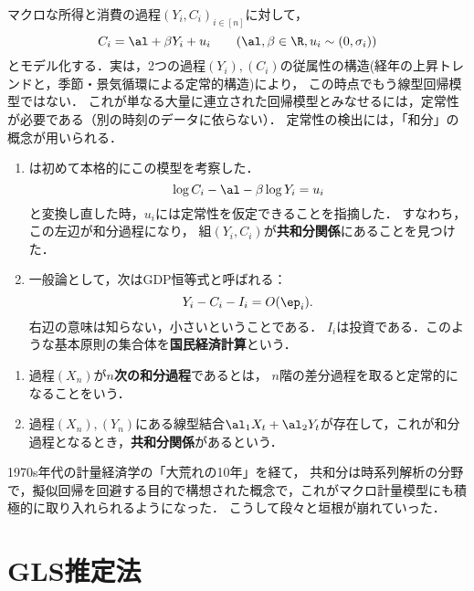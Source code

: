 \documentclass[uplatex,dvipdfmx]{jsreport}
\begin{document}
\begin{example}
    マクロな所得と消費の過程$(Y_i,C_i)_{i\in[n]}$に対して，
    \[C_i=\al+\beta Y_i+u_i\qquad(\al,\beta\in\R,u_i\sim(0,\sigma_i))\]
    とモデル化する．実は，2つの過程$(Y_i),(C_i)$の従属性の構造(経年の上昇トレンドと，季節・景気循環による定常的構造)により，
    この時点でもう線型回帰模型ではない．
    これが単なる大量に連立された回帰模型とみなせるには，定常性が必要である（別の時刻のデータに依らない）．
    定常性の検出には，「和分」の概念が用いられる．
    \begin{enumerate}
        \item \cite{Engle-Granger87}は初めて本格的にこの模型を考察した．
        \[\log C_i-\al-\beta\log Y_i=u_i\]
        と変換し直した時，$u_i$には定常性を仮定できることを指摘した．
        すなわち，この左辺が和分過程になり，
        組$(Y_i,C_i)$が\textbf{共和分関係}にあることを見つけた．
        \item 一般論として，次はGDP恒等式と呼ばれる：
        \[Y_i-C_i-I_i=O(\ep_i).\]
        右辺の意味は知らない，小さいということである．
        $I_i$は投資である．このような基本原則の集合体を\textbf{国民経済計算}という．
    \end{enumerate}
\end{example}

\begin{definition}\mbox{}
    \begin{enumerate}
        \item 過程$(X_n)$が\textbf{$n$次の和分過程}であるとは，
        $n$階の差分過程を取ると定常的になることをいう．
        \item 過程$(X_n),(Y_n)$にある線型結合$\al_1 X_t+\al_2 Y_t$が存在して，これが和分過程となるとき，\textbf{共和分関係}があるという．
    \end{enumerate}
\end{definition}

\begin{history}
    1970s年代の計量経済学の「大荒れの10年」を経て，
    共和分は時系列解析の分野で，擬似回帰を回避する目的で構想された概念で，これがマクロ計量模型にも積極的に取り入れられるようになった．
    こうして段々と垣根が崩れていった．
\end{history}

\section{GLS推定法}
\end{document}
